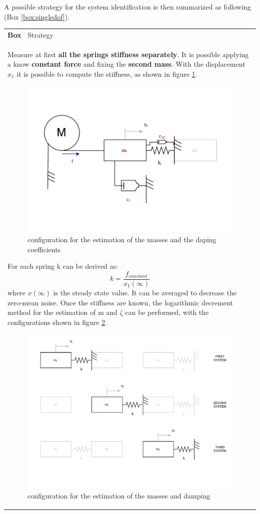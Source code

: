\documentclass[twosided,a4paper]{article}           %
\newcounter{box}
\newenvironment{scatola}[1]
{\refstepcounter{box}
\begin{center}
		\begin{tabular}{|p{\linewidth}|}
			\hline \textbf{Box~\thebox} #1  \\
		}
		{ 
			 \\ \hline
		\end{tabular} 
	\end{center}
 }
\begin{document}
A possible strategy for the system identification is then summarized as following (Box \ref{box:singledof}).
\begin{scatola}{Strategy}
	Measure at first \textbf{all the springs stiffness separately}. It is possible applying a know \textbf{constant force} and fixing the \textbf{second mass}. With the displacement $x_1$ it is possible to compute the stiffness, as shown in figure \ref{fig:sdof1}.
	\begin{figure}[H]
		\centering
		\includegraphics[width=0.5\linewidth]{img/strategy_onedof1}
		\caption[masses estimation]{configuration for the estimation of the masses and the daping coefficients}
		\label{fig:sdof1}
	\end{figure}
	For each spring k can be derived as:
	\begin{equation}
		k = \dfrac{f_{constant}}{x_{1}(\infty)}
	\end{equation}
	where $x(\infty)$ is the steady state value. It can be averaged to decrease the zero-mean noise.
	Once the stiffness are known, the logarithmic decrement method for the estimation of m and $\zeta$ can be performed, with the configurations shown in figure \ref{fig:sdof2}.
\begin{figure}[H]
	\centering
	\includegraphics[width=0.85\linewidth]{img/sdof2.pdf}
	\caption[masses estimation]{configuration for the estimation of the masses and damping}
	\label{fig:sdof2}
\end{figure}
	\label{box:singledof}
\end{scatola}
\end{document}
